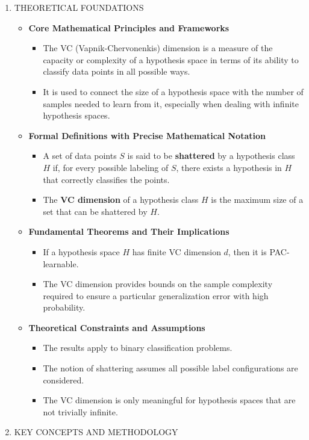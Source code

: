 \documentclass[
  12pt,
]{report}
\providecommand{\tightlist}{%
  \setlength{\itemsep}{0pt}\setlength{\parskip}{0pt}}
\begin{document}
\begin{enumerate}
\def\labelenumi{\arabic{enumi}.}
\item
  THEORETICAL FOUNDATIONS

  \begin{itemize}
  \tightlist
  \item
    \textbf{Core Mathematical Principles and Frameworks}

    \begin{itemize}
    \tightlist
    \item
      The VC (Vapnik-Chervonenkis) dimension is a measure of the capacity or complexity of a hypothesis space in terms of its ability to classify data points in all possible ways.
    \item
      It is used to connect the size of a hypothesis space with the number of samples needed to learn from it, especially when dealing with infinite hypothesis spaces.
    \end{itemize}
  \item
    \textbf{Formal Definitions with Precise Mathematical Notation}

    \begin{itemize}
    \tightlist
    \item
      A set of data points \(S\) is said to be \textbf{shattered} by a hypothesis class \(H\) if, for every possible labeling of \(S\), there exists a hypothesis in \(H\) that correctly classifies the points.
    \item
      The \textbf{VC dimension} of a hypothesis class \(H\) is the maximum size of a set that can be shattered by \(H\).
    \end{itemize}
  \item
    \textbf{Fundamental Theorems and Their Implications}

    \begin{itemize}
    \tightlist
    \item
      If a hypothesis space \(H\) has finite VC dimension \(d\), then it is PAC-learnable.
    \item
      The VC dimension provides bounds on the sample complexity required to ensure a particular generalization error with high probability.
    \end{itemize}
  \item
    \textbf{Theoretical Constraints and Assumptions}

    \begin{itemize}
    \tightlist
    \item
      The results apply to binary classification problems.
    \item
      The notion of shattering assumes all possible label configurations are considered.
    \item
      The VC dimension is only meaningful for hypothesis spaces that are not trivially infinite.
    \end{itemize}
  \end{itemize}
\item
  KEY CONCEPTS AND METHODOLOGY


\end{enumerate}
\end{document}

